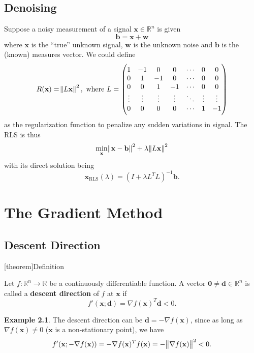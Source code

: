 \documentclass[12pt]{report}
\theoremstyle{definition}
\begin{document}
\section{Denoising}

Suppose a noisy measurement of a signal $\mathbf{x}\in\mathbb{R}^{n}$ is given
\[
    \mathbf{b}=\mathbf{x}+\mathbf{w}
\]
where $\mathbf{x}$ is the ``true'' unknown signal, $\mathbf{w}$ is the unknown
noise and $\mathbf{b}$ is the (known) measures vector.
We could define
\[
    R(\mathbf{x})=\norm{L\mathbf{x}}^2, \text{ where }
    L=
    \begin{pmatrix}
        1 & -1 & 0 & 0 & \cdots & 0 & 0 \\
        0 & 1 & -1 & 0 & \cdots & 0 & 0 \\
        0 & 0 & 1 & -1 & \cdots & 0 & 0 \\
        \vdots & \vdots & \vdots & \vdots & \ddots & \vdots & \vdots \\
        0 & 0 & 0 & 0 & \cdots & 1 & -1
    \end{pmatrix} 
\]
as the regularization function to penalize any sudden variations in signal. The
RLS is thus
\[
    \underset{\mathbf{x}}{\text{min}}
    \norm{\mathbf{x}-\mathbf{b}}^2
    +\lambda\norm{L\mathbf{x}}^2
\]
with its direct solution being
\[
    \mathbf{x}_\text{RLS}(\lambda)={(I+\lambda L^TL)}^{-1}\mathbf{b}.
\]


\chapter{The Gradient Method}

\section{Descent Direction}

[theorem]{Definition}
\begin{descent direction}
    Let $f:\mathbb{R}^{n}\rightarrow\mathbb{R}$ be a continuously differentiable function.
    A vector $\mathbf{0}\neq\mathbf{d}\in\mathbb{R}^{n}$ is called a
    \textbf{descent direction} of $f$ at $\mathbf{x}$ if
    \[
        f'(\mathbf{x};\mathbf{d})=\nabla f(\mathbf{x})^T\mathbf{d}<0.
    \]
\end{descent direction}

\newtheorem{descent direction example}[theorem]{Example}
\begin{descent direction example}
    The descent direction can be $\mathbf{d}=-\nabla f(\mathbf{x})$,
    since as long as $\nabla f(\mathbf{x})\neq 0$ 
    ($\mathbf{x}$ is a non-stationary point), we have
    \[
        f'(\mathbf{x};-\nabla f(\mathbf{x}))=-\nabla f(\mathbf{x})^Tf(\mathbf{x})
        =-\norm{\nabla f(\mathbf{x})}^2 < 0.
    \]
\end{descent direction example}
\end{document}
